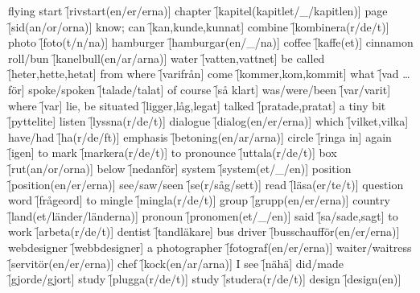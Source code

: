 \begin{questions}
    \begin{multicols}{2}
        \raggedcolumns
        \question flying start \f[rivstart(en/er/erna)]
        \question chapter \f[kapitel(kapitlet/\_/kapitlen)]
        \question page \f[sid(an/or/orna)]
        \question know; can \f[kan,kunde,kunnat]
        \question combine \f[kombinera(r/de/t)]
        \question photo \f[foto(t/n/na)]
        \question hamburger \f[hamburgar(en/\_/na)]
        \question coffee \f[kaffe(et)]
        \question cinnamon roll/bun \f[kanelbull(en/ar/arna)]
        \question water \f[vatten,vattnet]
        \question be called \f[heter,hette,hetat]
        \question from where \f[varifrån]
        \question come \f[kommer,kom,kommit]
        \question what \f[vad \ldots för]
        \question spoke/spoken \f[talade/talat]
        \question of course \f[så klart]
        \question was/were/been \f[var/varit]
        \question where \f[var]
        \question lie, be situated \f[ligger,låg,legat]
        \question talked \f[pratade,pratat]
        \question a tiny bit \f[pyttelite]
        \question listen \f[lyssna(r/de/t)]
        \question dialogue \f[dialog(en/er/erna)]
        \question which \f[vilket,vilka]
        \question have/had \f[ha(r/de/ft)]
        \question emphasis \f[betoning(en/ar/arna)]
        \question circle \f[ringa in]
        \question again \f[igen]
        \question to mark \f[markera(r/de/t)]
        \question to pronounce \f[uttala(r/de/t)]
        \question box \f[rut(an/or/orna)]
        \question below \f[nedanför]
        \question system \f[system(et/\_/en)]
        \question position \f[position(en/er/erna)]
        \question see/saw/seen \f[se(r/såg/sett)]
        \question read \f[läsa(er/te/t)]
        \question question word \f[frågeord]
        \question to mingle \f[mingla(r/de/t)]
        \question group \f[grupp(en/er/erna)]
        \question country \f[land(et/länder/länderna)]
        \question pronoun \f[pronomen(et/\_/en)]
        \question said \f[sa/sade,sagt]
        \question to work \f[arbeta(r/de/t)]
        \question dentist \f[tandläkare]
        \question bus driver \f[busschaufför(en/er/erna)]
        \question webdesigner \f[webbdesigner]
        \question a photographer \f[fotograf(en/er/erna)]
        \question waiter/waitress \f[servitör(en/er/erna)]
        \question chef \f[kock(en/ar/arna)]
        \question I see \f[nähä]
        \question did/made \f[gjorde/gjort]
        \question study \f[plugga(r/de/t)]
        \question study \f[studera(r/de/t)]
        \question design \f[design(en)]

\end{multicols}
\end{questions}
